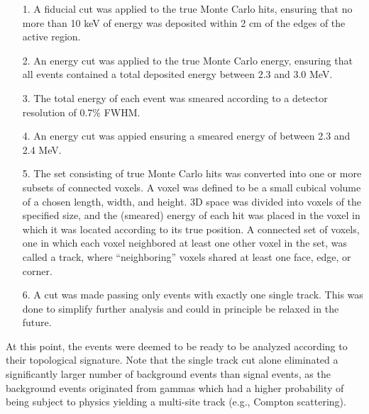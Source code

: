 \documentclass{JINST}
\begin{document}
\begin{enumerate}
	\item[1.] A fiducial cut was applied to the true Monte Carlo hits, ensuring that no more than 10 keV of energy was deposited within 2 cm of the edges of the active region.
	\item[2.] An energy cut was applied to the true Monte Carlo energy, ensuring that all events contained a total deposited energy between 2.3 and 3.0 MeV.
	\item[3.] The total energy of each event was smeared according to a detector resolution of 0.7\% FWHM.
	\item[4.] An energy cut was appied ensuring a smeared energy of between 2.3 and 2.4 MeV.
	\item[5.] The set consisting of true Monte Carlo hits was converted into one or more subsets of connected voxels.  A voxel was defined to be a small cubical volume of a chosen 
	length, width, and height.  3D space was divided into voxels of the specified size, and the (smeared) energy of each hit was placed in the voxel in which it was located according to its
	true position.  A connected set of voxels, one in which each voxel neighbored at least one other voxel in the set, was called a track, where ``neighboring'' voxels shared at least one face, edge,
	or corner.
	\item[6.] A cut was made passing only events with exactly one single track.  This was done to simplify further analysis and could in principle be relaxed in the future.
\end{enumerate}

At this point, the events were deemed to be ready to be analyzed according to their topological signature.  Note that the single track cut alone eliminated a significantly larger number of 
background events than signal events, as the background events originated from gammas which had a higher probability of being subject to physics yielding a multi-site track (e.g., Compton 
scattering).
\end{document}
